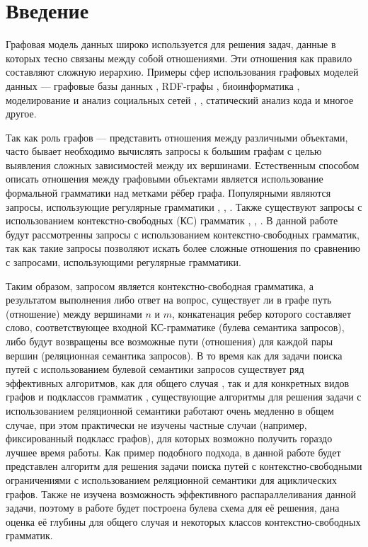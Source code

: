 \documentclass{spbau-diploma}
\begin{document}
\section*{Введение}
Графовая модель данных широко используется для решения
задач, данные в которых тесно связаны между собой
отношениями. Эти отношения как правило составляют сложную
иерархию. Примеры сфер использования графовых моделей
данных --- графовые базы данных \cite{GraphDB}, RDF-графы \cite{RDF}, биоинформатика \cite{Bio},
моделирование и анализ социальных сетей \cite{Warcha2012UsingNG}, \cite{social}, статический
анализ кода \cite{Static} и многое другое. \par
Так как роль графов ---
представить отношения между различными объектами,
часто бывает необходимо вычислять запросы к большим графам с целью
выявления сложных зависимостей между их вершинами. Естественным способом описать отношения
между графовыми объектами является использование
формальной грамматики над метками рёбер графа. Популярными являются запросы, использующие регулярные грамматики \cite{Reg1}, \cite{Reg2}, \cite{Reg3}. Также существуют запросы с использованием
контекстно-свободных (КС) грамматик \cite{HellConj}, \cite{HellingsCFPQ}, \cite{MatrixMult}. В данной работе будут рассмотренны запросы с использованием контекстно-свободных грамматик, так как такие запросы позволяют искать более сложные отношения по сравнению с запросами, использующими регулярные грамматики. \par
 Таким образом, запросом является контекстно-свободная грамматика, а результатом выполнения либо ответ на вопрос, существует ли в графе путь (отношение) между вершинами $n$ и $m$, конкатенация ребер которого составляет слово, соответствующее входной КС-грамматике (булева семантика запросов), либо будут возвращены все возможные пути (отношения) для каждой пары вершин (реляционная семантика запросов). В то время как для задачи поиска путей с использованием булевой семантики запросов существует ряд эффективных алгоритмов, как для общего случая \cite{Reps}, так и для конкретных видов графов и подклассов грамматик \cite{DyckTrees}, существующие алгоритмы для решения задачи с использованием реляционной семантики работают очень  медленно в общем случае, при этом практически не изучены частные случаи (например, фиксированный подкласс графов),  для которых возможно получить гораздо лучшее время работы. Как пример подобного подхода, в данной работе будет представлен алгоритм для решения задачи поиска путей с контекстно-свободными ограничениями с использованием реляционной семантики для ациклических графов. Также не изучена возможность эффективного распараллеливания данной задачи, поэтому в работе будет построена булева схема для её решения, дана оценка её глубины для общего случая и некоторых классов контекстно-свободных грамматик. 
\end{document}
